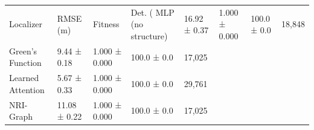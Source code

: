 \begin{tabular}{lllll}
\toprule
Localizer & RMSE (m) & Fitness & Det. (%
\midrule
MLP (no structure) & 16.92 ± 0.37 & 1.000 ± 0.000 & 100.0 ± 0.0 & 18,848 \\
Green's Function & 9.44 ± 0.18 & 1.000 ± 0.000 & 100.0 ± 0.0 & 17,025 \\
Learned Attention & 5.67 ± 0.33 & 1.000 ± 0.000 & 100.0 ± 0.0 & 29,761 \\
NRI-Graph & 11.08 ± 0.22 & 1.000 ± 0.000 & 100.0 ± 0.0 & 17,025 \\
\bottomrule
\end{tabular}
